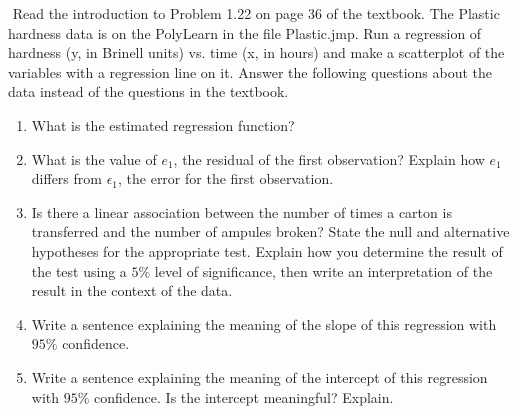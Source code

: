 \documentclass[10pt]{article}
\newenvironment{problem}[2][Problem]{\begin{trivlist}
\item[\hskip \labelsep {\bfseries #1}\hskip \labelsep {\bfseries #2.}]}{\end{trivlist}}
\begin{document}
\begin{problem}{8}
$ $\newline
Read the introduction to Problem 1.22 on page 36 of the textbook.  The Plastic hardness data is on the PolyLearn in the file Plastic.jmp.  Run a regression of hardness (y, in Brinell units) vs. time (x, in hours) and make a scatterplot of the variables with a regression line on it.  Answer the following questions about the data instead of the questions in the textbook.
\begin{enumerate}
    \item What is the estimated regression function?
    \item What is the value of $e_{1}$, the residual of the first observation?  Explain how $e_{1}$ differs from $\epsilon_{1}$, the error for the first observation.
    \item Is there a linear association between the number of times a carton is transferred and the number of ampules broken?  State the null and alternative hypotheses for the appropriate test.  Explain how you determine the result of the test using a $5\%$ level of significance, then write an interpretation of the result in the context of the data.
    \item Write a sentence explaining the meaning of the slope of this regression with $95\%$ confidence.
    \item Write a sentence explaining the meaning of the intercept of this regression with $95\%$ confidence.  Is the intercept meaningful? Explain.
\end{enumerate}
\end{problem}
\end{document}
